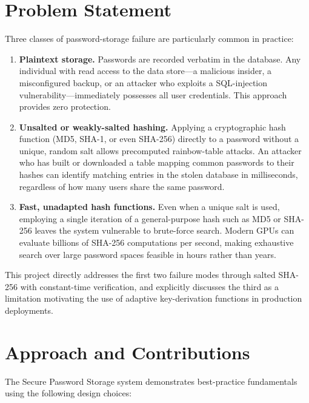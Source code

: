 \section{Problem Statement}
\label{sec:intro_problem}

Three classes of password-storage failure are particularly common in practice:

\begin{enumerate}
  \item \textbf{Plaintext storage.} Passwords are recorded verbatim in the database. Any individual with read access to the data store---a malicious insider, a misconfigured backup, or an attacker who exploits a SQL-injection vulnerability---immediately possesses all user credentials. This approach provides zero protection.

  \item \textbf{Unsalted or weakly-salted hashing.} Applying a cryptographic hash function (MD5, SHA-1, or even SHA-256) directly to a password without a unique, random salt allows precomputed rainbow-table attacks. An attacker who has built or downloaded a table mapping common passwords to their hashes can identify matching entries in the stolen database in milliseconds, regardless of how many users share the same password.

  \item \textbf{Fast, unadapted hash functions.} Even when a unique salt is used, employing a single iteration of a general-purpose hash such as MD5 or SHA-256 leaves the system vulnerable to brute-force search. Modern GPUs can evaluate billions of SHA-256 computations per second, making exhaustive search over large password spaces feasible in hours rather than years.
\end{enumerate}

This project directly addresses the first two failure modes through salted SHA-256 with constant-time verification, and explicitly discusses the third as a limitation motivating the use of adaptive key-derivation functions in production deployments.

\section{Approach and Contributions}
\label{sec:intro_approach}

The Secure Password Storage system demonstrates best-practice fundamentals using the following design choices:

